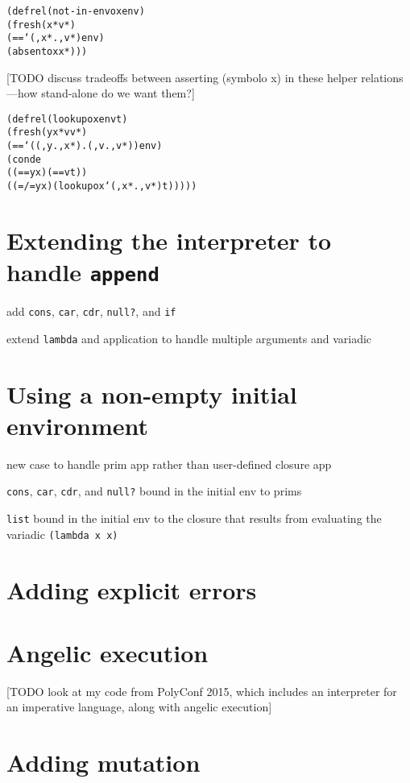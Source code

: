 \documentclass{book}
\begin{document}
\begin{alltt}
(defrel (not-in-envo x env)
  (fresh (x* v*)
    (== `(,x* . ,v*) env)
    (absento x x*)))
\end{alltt}

[TODO discuss tradeoffs between asserting (symbolo x) in these helper relations---how stand-alone do we want them?]

\begin{alltt}
(defrel (lookupo x env t)
  (fresh (y x* v v*)
    (== `((,y . ,x*) . (,v . ,v*)) env)
    (conde
      ((== y x) (== v t))
      ((=/= y x) (lookupo x `(,x* . ,v*) t)))))
\end{alltt}



\chapter{Extending the interpreter to handle \texttt{append}}%

add \verb|cons|, \verb|car|, \verb|cdr|, \verb|null?|, and \verb|if|

extend \verb|lambda| and application to handle multiple arguments and variadic 


\chapter{Using a non-empty initial environment}%

new case to handle prim app rather than user-defined closure app

\verb|cons|, \verb|car|, \verb|cdr|, and \verb|null?| bound in the initial env to prims

\verb|list| bound in the initial env to the closure that results from evaluating the variadic \verb|(lambda x x)|


\chapter{Adding explicit errors}%


\chapter{Angelic execution}%

[TODO look at my code from PolyConf 2015, which includes an interpreter for an imperative language, along with angelic execution]

\chapter{Adding mutation}%
\end{document}
